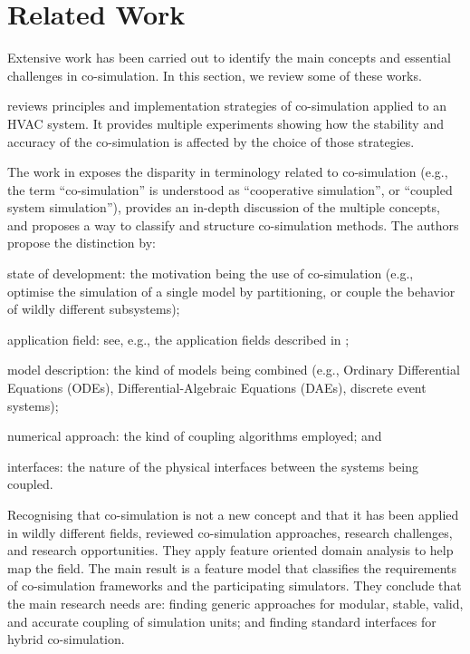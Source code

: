 
\section{Related Work}\label{sec:related}

Extensive work has been carried out to identify the main concepts and essential challenges in co-simulation.
In this section, we review some of these works.

\cite{Trcka2007} reviews principles and implementation strategies of co-simulation applied to an HVAC system.
It provides multiple experiments showing how the stability and accuracy of the co-simulation is affected by the choice of those strategies.

The work in \cite{Hafner2017} exposes the disparity in terminology related to co-simulation (e.g., the term ``co-simulation'' is understood as ``cooperative simulation'', or ``coupled system simulation''), provides an in-depth discussion of the multiple concepts, and proposes a way to classify and structure co-simulation methods.
The authors propose the distinction by:
\begin{compactdesc}
\item[state of development:] the motivation being the use of co-simulation (e.g., optimise the simulation of a single model by partitioning, or couple the behavior of wildly different subsystems);
\item[application field:] see, e.g., the application fields described in \cite{Gomes2017};
\item[model description:]  the kind of models being combined (e.g., Ordinary Differential Equations (ODEs), Differential-Algebraic Equations (DAEs), discrete event systems);
\item[numerical approach:] the kind of coupling algorithms employed; and
\item[interfaces:]  the nature of the physical interfaces between the systems being coupled.
\end{compactdesc}

Recognising that co-simulation is not a new concept and that it has been applied in wildly different fields, \cite{Gomes2018} reviewed co-simulation approaches, research challenges, and research opportunities.
They apply feature oriented domain analysis \cite{Kang1990} to help map the field.
The main result is a feature model that classifies the requirements of co-simulation frameworks and the participating simulators.
They conclude that the main research needs are: finding generic approaches for modular, stable, valid, and accurate coupling of simulation units; and finding standard interfaces for hybrid co-simulation.

